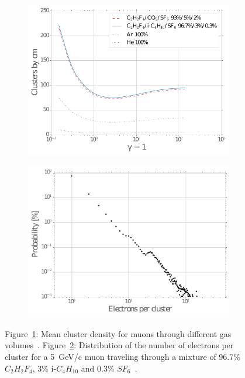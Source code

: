 	\begin{figure}[H]
		\begin{subfigure}{0.5\linewidth}
			\centering
			\includegraphics[width = 0.5\plotwidth]{fig/chapt4/Cluster-distribution.pdf}
			\caption{\label{fig:ClusterDensity:A}}
		\end{subfigure}
		\begin{subfigure}{0.5\linewidth}
			\centering
			\includegraphics[width = 0.5\plotwidth]{fig/chapt4/N_elec_cluster_RPC.pdf}
			\caption{\label{fig:ClusterDensity:B}}
		\end{subfigure}
		\caption{\label{fig:ClusterDensity} Figure~\ref{fig:ClusterDensity:A}: Mean cluster density for muons through different gas volumes~\cite{VINCENT2017}. Figure~\ref{fig:ClusterDensity:B}: Distribution of the number of electrons per cluster for a \SI{5}{GeV/c} muon traveling through a mixture of 96.7\% $C_2H_2F_4$, 3\% i-$C_4H_{10}$ and 0.3\% $SF_6$~\cite{VINCENT2017,RIEGLER2003}.}
	\end{figure}
	

